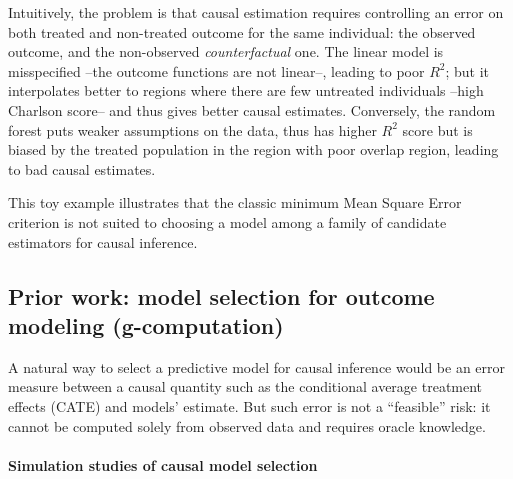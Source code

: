 \documentclass[10pt]{article}
\begin{document}
\begin{multicols}{2}
    Intuitively, the problem is that causal estimation requires controlling
    an error on both treated and non-treated outcome for the same individual:
    the observed outcome, and the non-observed \emph{counterfactual} one.
    The linear model is misspecified --the outcome functions are not
    linear--, leading to poor $R^2$; but it interpolates better to regions
    where there are few untreated individuals --high Charlson score-- and
    thus gives better causal estimates. Conversely, the random forest puts
    weaker assumptions on the data, thus has higher $R^2$ score but is biased
    by the treated population in the region with poor overlap region, leading
    to bad causal estimates.

    This toy example illustrates that the classic minimum Mean Square Error
    criterion is not suited to choosing a model among a family of candidate
    estimators for causal inference.



    \subsection{Prior work: model selection for outcome modeling (g-computation)}%


    A natural way to select a predictive model for causal inference would be
    an error measure between a causal quantity such as the conditional
    average treatment effects (CATE) and models' estimate. But such error is
    not a ``feasible'' risk: it cannot be computed solely from observed data
    and requires oracle knowledge.


    \paragraph{Simulation studies of causal model selection}


\end{multicols}
\end{document}
